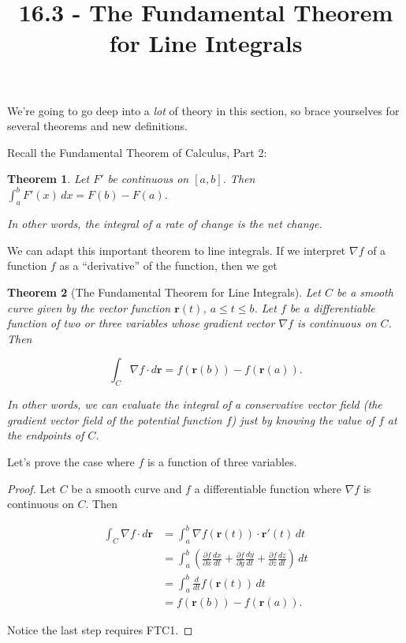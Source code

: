 \documentclass[11pt,oneside,english]{amsart}
\newtheorem{theorem}{Theorem}
\theoremstyle{definition}
\newcommand{\dd}[2]{\frac{d{#1}}{d{#2}}}
\newcommand{\pp}[2]{\frac{\partial{#1}}{\partial{#2}}}
\begin{document}
\vspace*{-1cm}
\title{16.3 - The Fundamental Theorem for Line Integrals}
\maketitle

We're going to go deep into a \textit{lot} of theory in this section, so brace yourselves for several theorems and new definitions.

Recall the Fundamental Theorem of Calculus, Part 2:

\begin{theorem}
Let $F'$ be continuous on $[a,b]$. Then $\displaystyle \int_a^bF'(x)\,dx=F(b)-F(a)$.

In other words, the integral of a rate of change is the net change.
\end{theorem}

We can adapt this important theorem to line integrals. If we interpret $\nabla f$ of a function $f$ as a ``derivative'' of the function, then we get

\begin{theorem}[The Fundamental Theorem for Line Integrals]
Let $C$ be a smooth curve given by the vector function $\mathbf{r}(t)$, $a\leq t\leq b$. Let $f$ be a differentiable function of two or three variables whose gradient vector $\nabla f$ is continuous on $C$. Then

\[
\int_C\nabla f\cdot d\mathbf{r}=f(\mathbf{r}(b))-f(\mathbf{r}(a)).
\]

In other words, we can evaluate the integral of a conservative vector field (the gradient vector field of the potential function $f$) just by knowing the value of $f$ at the endpoints of $C$. 
\end{theorem}

Let's prove the case where $f$ is a function of three variables.

\begin{proof}
Let $C$ be a smooth curve and $f$ a differentiable function where $\nabla f$ is continuous on $C$. Then

\begin{align*}
\int_C\nabla f\cdot d\mathbf{r}&=\int_a^b\nabla f(\mathbf{r}(t))\cdot\mathbf{r}'(t)\,dt\\[2mm]
&=\int_a^b\left(\pp{f}{x}\dd{x}{t}+\pp{f}{y}\dd{y}{t}+\pp{f}{z}\dd{z}{t}\right)\,dt\\[2mm]
&=\int_a^b\dd{}{t}f(\mathbf{r}(t))\,dt\\[2mm]
&=f(\mathbf{r}(b))-f(\mathbf{r}(a)).
\end{align*}

Notice the last step requires FTC1.
\end{proof}
\end{document}
